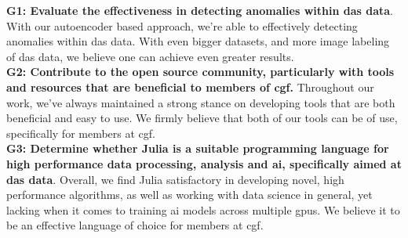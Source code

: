 

\textbf{G1: Evaluate the effectiveness in detecting anomalies within \acrshort{das} data}. With our autoencoder based approach, we're able to effectively detecting anomalies within \acrshort{das} data. With even bigger datasets, and more image labeling of \acrshort{das} data, we believe one can achieve even greater results. \\

\textbf{G2: Contribute to the open source community, particularly with tools and resources that are beneficial to members of \acrshort{cgf}.} Throughout our work, we've always maintained a strong stance on developing tools that are both beneficial and easy to use. We firmly believe that both of our tools can be of use, specifically for members at \acrshort{cgf}.  \\ 

\textbf{G3: Determine whether Julia is a suitable programming language for 
 high performance data processing, analysis and \acrshort{ai}, specifically aimed at \acrshort{das} data}. Overall, we find Julia satisfactory in developing novel, high performance algorithms, as well as working with data science in general, yet lacking when it comes to training \acrshort{ai} models across multiple \acrshort{gpu}s. We believe it to be an effective language of choice for members at \acrshort{cgf}.\\


